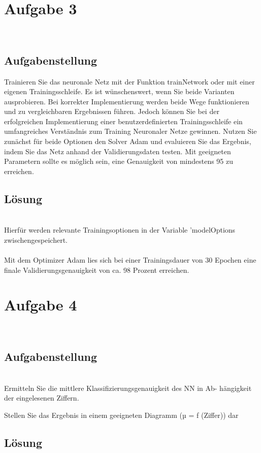 \documentclass[8pt,a4paper]{article}
\begin{document}
\\
\section{Aufgabe 3}
\\
\subsection{Aufgabenstellung}
Trainieren Sie das neuronale Netz mit der Funktion trainNetwork oder
mit einer eigenen Trainingsschleife. Es ist wünschenswert, wenn Sie
beide Varianten ausprobieren. Bei korrekter Implementierung werden
beide Wege funktionieren und zu vergleichbaren Ergebnissen führen.
Jedoch können Sie bei der erfolgreichen Implementierung einer benutzerdefinierten Trainingsschleife ein umfangreiches Verständnis zum
Training Neuronaler Netze gewinnen. Nutzen Sie zunächst für beide
Optionen den Solver Adam und evaluieren Sie das Ergebnis, indem Sie
das Netz anhand der Validierungsdaten testen. Mit geeigneten Parametern sollte es möglich sein, eine Genauigkeit von mindestens 95 %
zu erreichen.\\
\subsection{Lösung}
\\
Hierfür werden relevante Trainingsoptionen in der Variable 'modelOptions zwischengespeichert.
\\

\\
Mit dem Optimizer Adam lies sich bei einer Trainingsdauer von 30 Epochen eine finale Validierungsgenauigkeit von ca. 98 Prozent erreichen.
\\
\section{Aufgabe 4}
\\
\subsection{Aufgabenstellung}
\\Ermitteln Sie die mittlere Klassifizierungsgenauigkeit des NN in Ab-
hängigkeit der eingelesenen Ziffern.

Stellen Sie das Ergebnis in einem geeigneten Diagramm (µ = f (Ziffer))
dar
\subsection{Lösung}
\end{document}
